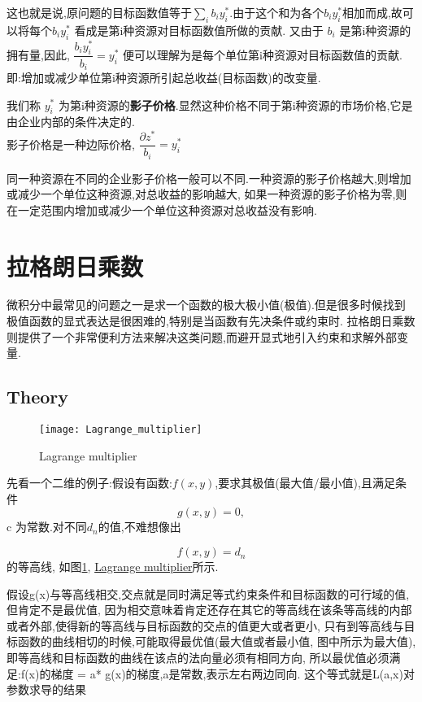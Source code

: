 \documentclass{article}
\begin{document}
这也就是说,原问题的目标函数值等于$\sum_i b_i y^*_i$.由于这个和为各个$b_i y^*_i$相加而成,故可以将每个$b_i y^*_i$ 看成是第i种资源对目标函数值所做的贡献.
又由于 $b_i$ 是第i种资源的拥有量,因此, $\dfrac{b_i y^*_i}{b_i} = y^*_i$ 便可以理解为是每个单位第i种资源对目标函数值的贡献.
即:增加或减少单位第i种资源所引起总收益(目标函数)的改变量.

我们称 $y^*_i$ 为第i种资源的\textbf{影子价格}.显然这种价格不同于第i种资源的市场价格,它是由企业内部的条件决定的.\\
影子价格是一种边际价格, $\dfrac{\partial z^*}{b_i} = y^*_i$

同一种资源在不同的企业影子价格一般可以不同.一种资源的影子价格越大,则增加或减少一个单位这种资源,对总收益的影响越大,
如果一种资源的影子价格为零,则在一定范围内增加或减少一个单位这种资源对总收益没有影响.

\section{拉格朗日乘数}
微积分中最常见的问题之一是求一个函数的极大极小值(极值).但是很多时候找到极值函数的显式表达是很困难的,特别是当函数有先决条件或约束时.
拉格朗日乘数则提供了一个非常便利方法来解决这类问题,而避开显式地引入约束和求解外部变量.

\subsection{Theory}
\begin{figure}[htbp]
  \centering
  \texttt{[image: Lagrange\_multiplier]}\\
  \caption{Lagrange multiplier}\label{fig.Lagrange.multiplier}
\end{figure}

先看一个二维的例子:假设有函数:$f(x, y)$,要求其极值(最大值/最小值),且满足条件
$$ g\left( x,y \right) = 0, $$
c 为常数.对不同$d_n$的值,不难想像出

$$ f \left( x, y \right)=d_n $$
的等高线, 如图\ref{fig.Lagrange.multiplier},
\href{http://upload.wikimedia.org/wikipedia/commons/thumb/f/fa/Lagrange\_multiplier.png/300px-Lagrange\_multiplier.png}{Lagrange multiplier}所示.

假设g(x)与等高线相交,交点就是同时满足等式约束条件和目标函数的可行域的值,但肯定不是最优值,
因为相交意味着肯定还存在其它的等高线在该条等高线的内部或者外部,使得新的等高线与目标函数的交点的值更大或者更小,
只有到等高线与目标函数的曲线相切的时候,可能取得最优值(最大值或者最小值, 图中所示为最大值),
即等高线和目标函数的曲线在该点的法向量必须有相同方向,
所以最优值必须满足:f(x)的梯度 = a* g(x)的梯度,a是常数,表示左右两边同向.
这个等式就是L(a,x)对参数求导的结果
\end{document}
